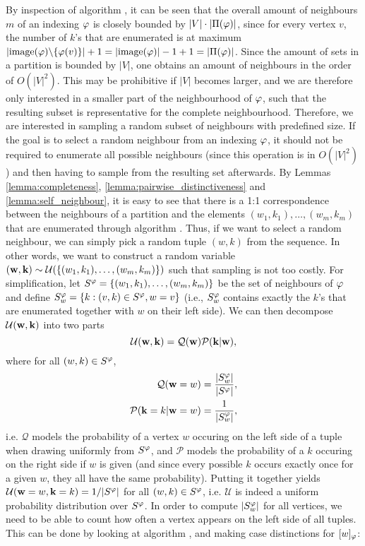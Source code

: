 By inspection of algorithm \emph{}, it can be seen that the overall amount of neighbours $m$ of an indexing $\varphi$ is closely bounded by $|V|\cdot |\Pi(\varphi)|$, since for every vertex $v$, the number of $k$'s that are enumerated is at maximum $|\mathrm{image}(\varphi)\backslash\{ \varphi(v) \}| + 1 = |\mathrm{image}(\varphi)|-1+1 = |\Pi(\varphi)|$. Since the amount of sets in a partition is bounded by $|V|$, one obtains an amount of neighbours in the order of $O(|V|^2)$. This may be prohibitive if $|V|$ becomes larger, and we are therefore only interested in a smaller part of the neighbourhood of $\varphi$, such that the resulting subset is representative for the complete neighbourhood. Therefore, we are interested in sampling a random subset of neighbours with predefined size. If the goal is to select a random neighbour from an indexing $\varphi$, it should not be required to enumerate all possible neighbours (since this operation is in $O(|V|^2)$) and then having to sample from the resulting set afterwards. By Lemmas \ref{lemma:completeness}, \ref{lemma:pairwise_distinctiveness} and \ref{lemma:self_neighbour}, it is easy to see that there is a 1:1 correspondence between the neighbours of a partition and the elements $(w_1,k_1),\dots,(w_m,k_m)$ that are enumerated through algorithm \emph{}. Thus, if we want to select a random neighbour, we can simply pick a random tuple $(w,k)$ from the sequence. In other words, we want to construct a random variable $({\bf w}, {\bf k}) \sim \mathcal{U}(\{ (w_1,k_1),\dots,(w_m,k_m) \})$ such that sampling is not too costly. For simplification, let $S^\varphi = \{ (w_1,k_1),\dots,(w_m,k_m) \}$ be the set of neighbours of $\varphi$ and define $S^\varphi_w = \{ k : (v,k) \in S^\varphi, w=v \}$ (i.e., $S^\varphi_w$ contains exactly the $k$'s that are enumerated together with $w$ on their left side). We can then decompose $\mathcal{U}({\bf w}, {\bf k})$ into two parts
$$ \mathcal{U}({\bf w}, {\bf k}) = \mathcal{Q}({\bf w}) \mathcal{P}({\bf k}|{\bf w}), $$ where for all $(w,k) \in S^\varphi$,
\begin{align*}
    \mathcal{Q}({\bf w} = w) &= \frac{| S^\varphi_w |}{|S^\varphi|},\\
    \mathcal{P}({\bf k} = k | {\bf w} = w) &= \frac{1}{| S^\varphi_w |},
\end{align*}
i.e. $\mathcal{Q}$ models the probability of a vertex $w$ occuring on the left side of a tuple when drawing uniformly from $S^\varphi$, and $\mathcal{P}$ models the probability of a $k$ occuring on the right side if $w$ is given (and since every possible $k$ occurs exactly once for a given $w$, they all have the same probability). Putting it together yields $\mathcal{U}({\bf w}=w, {\bf k}=k) = 1/|S^\varphi|$ for all $(w,k) \in S^\varphi$, i.e. $\mathcal{U}$ is indeed a uniform probability distribution over $S^\varphi$. In order to compute $|S^\varphi_w|$ for all vertices, we need to be able to count how often a vertex appears on the left side of all tuples. This can be done by looking at algorithm \emph{}, and making case distinctions for $[w]_\varphi$:
